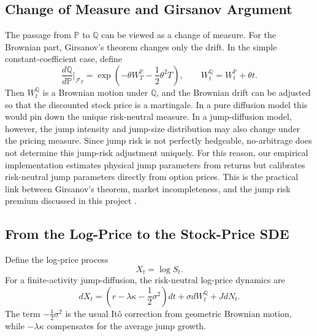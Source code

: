 \documentclass[12pt]{article}
\begin{document}
\subsection*{Change of Measure and Girsanov Argument}

The passage from $\mathbb{P}$ to $\mathbb{Q}$ can be viewed as a change of measure. For the Brownian part, Girsanov's theorem changes only the drift. In the simple constant-coefficient case, define
\begin{equation}
\frac{d\mathbb{Q}}{d\mathbb{P}}\bigg|_{\mathcal{F}_T}
=\exp\left(-\theta W_T^{\mathbb{P}}-\frac{1}{2}\theta^2T\right),
\qquad
W_t^{\mathbb{Q}}=W_t^{\mathbb{P}}+\theta t.
\label{eq:girsanov_density}
\end{equation}
Then $W_t^{\mathbb{Q}}$ is a Brownian motion under $\mathbb{Q}$, and the Brownian drift can be adjusted so that the discounted stock price is a martingale. In a pure diffusion model this would pin down the unique risk-neutral measure. In a jump-diffusion model, however, the jump intensity and jump-size distribution may also change under the pricing measure. Since jump risk is not perfectly hedgeable, no-arbitrage does not determine this jump-risk adjustment uniquely. For this reason, our empirical implementation estimates physical jump parameters from returns but calibrates risk-neutral jump parameters directly from option prices. This is the practical link between Girsanov's theorem, market incompleteness, and the jump risk premium discussed in this project \citep{Shreve2004}.

\subsection*{From the Log-Price to the Stock-Price SDE}

Define the log-price process
\begin{equation}
X_t=\log S_t.
\label{eq:log_price}
\end{equation}
For a finite-activity jump-diffusion, the risk-neutral log-price dynamics are
\begin{equation}
dX_t=
\left(r-\lambda\kappa-\frac{1}{2}\sigma^2\right)dt
+\sigma dW_t^{\mathbb{Q}}+JdN_t.
\label{eq:log_sde}
\end{equation}
The term $-\frac{1}{2}\sigma^2$ is the usual It\^{o} correction from geometric Brownian motion, while $-\lambda\kappa$ compensates for the average jump growth.
\end{document}
